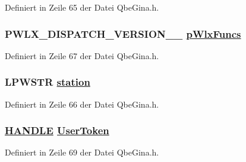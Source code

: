 Definiert in Zeile 65 der Datei Qbe\-Gina.h.\hypertarget{structGINA__CONTEXT_GINA__CONTEXTo2}{
\subsubsection[pWlxFuncs]{\setlength{\rightskip}{0pt plus 5cm}PWLX\_\-DISPATCH\_\-VERSION\_\_ \hyperlink{structGINA__CONTEXT_GINA__CONTEXTo2}{p\-Wlx\-Funcs}}}
\label{structGINA__CONTEXT_GINA__CONTEXTo2}




Definiert in Zeile 67 der Datei Qbe\-Gina.h.\hypertarget{structGINA__CONTEXT_GINA__CONTEXTo1}{
\subsubsection[station]{\setlength{\rightskip}{0pt plus 5cm}LPWSTR \hyperlink{structGINA__CONTEXT_GINA__CONTEXTo1}{station}}}
\label{structGINA__CONTEXT_GINA__CONTEXTo1}




Definiert in Zeile 66 der Datei Qbe\-Gina.h.\hypertarget{structGINA__CONTEXT_GINA__CONTEXTo4}{
\subsubsection[UserToken]{\setlength{\rightskip}{0pt plus 5cm}\hyperlink{QbeGina_8h_a0}{HANDLE} \hyperlink{structGINA__CONTEXT_GINA__CONTEXTo4}{User\-Token}}}
\label{structGINA__CONTEXT_GINA__CONTEXTo4}




Definiert in Zeile 69 der Datei Qbe\-Gina.h.